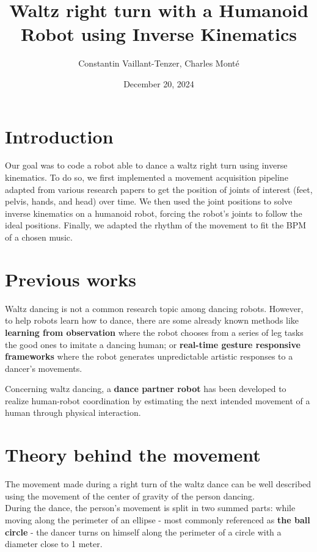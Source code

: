 \documentclass{amsart}
\date{December 20, 2024}
\title{Waltz right turn with a Humanoid Robot using Inverse Kinematics}
\author{Constantin Vaillant-Tenzer, Charles Monté}
\theoremstyle{definition}
\theoremstyle{plain}
\begin{document}
\maketitle


\section{Introduction}


Our goal was to code a robot able to dance a waltz right turn using inverse kinematics. To do so, we first implemented a movement acquisition pipeline adapted from various research papers to get the position of joints of interest (feet, pelvis, hands, and head) over time. We then used the joint positions to solve inverse kinematics on a humanoid robot, forcing the robot's joints to follow the ideal positions. Finally, we adapted the rhythm of the movement to fit the BPM of a chosen music.

\section{Previous works}
Waltz dancing is not a common research topic among dancing robots. However, to help robots learn how to dance, there are some already known methods like \textbf{learning from observation}\cite{traditional_jap_dance} where the robot chooses from a series of leg tasks the good ones to imitate a dancing human; or \textbf{real-time gesture responsive frameworks}\cite{spectacle_imitation} where the robot generates unpredictable artistic responses to a dancer's movements.

Concerning waltz dancing, a \textbf{dance partner robot}\cite{ballroom_dance} has been developed to realize human-robot coordination by estimating the next intended movement of a human through physical interaction.

\section{Theory behind the movement}


The movement made during a right turn of the waltz dance can be well described using the movement of the center of gravity of the person dancing. \\ 

During the dance, the person's movement is split in two summed parts: while moving along the perimeter of an ellipse - most commonly referenced as \textbf{the ball circle} - the dancer turns on himself along the perimeter of a circle with a diameter close to 1 meter.\\
\end{document}
